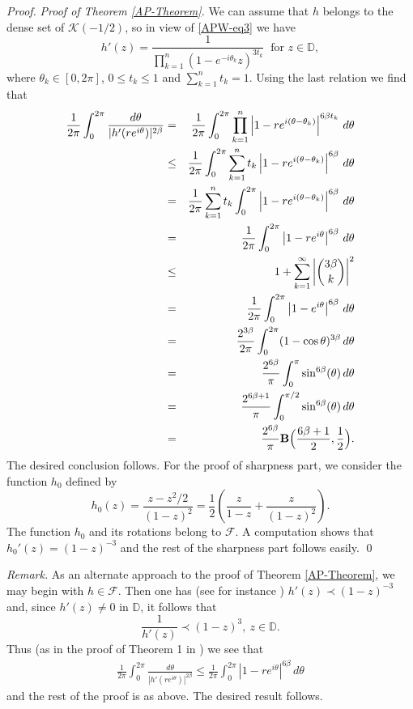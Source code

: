 \documentclass[a4paper,12pt]{amsart}
\theoremstyle{definition}
\newenvironment{rem}{\bigskip
\noindent \textsl{{\sl Remark. }}}{\bigskip}
\newenvironment{pf}[1][]{ \vskip 3mm
 \noindent
 \ifthenelse{\equal{#1}{}}  {{\slshape Proof. }}  {{\slshape #1.} } }{\qed\bigskip}
\begin{document}
\begin{pf}[Proof of Theorem \ref{AP-Theorem}]
We can assume that $h$ belongs to the dense set of $ \mathcal{K}(-1/2)$, so in view of 
\eqref{APW-eq3} we have
$$h'(z)=\frac{1}{\prod _{k=1}^n(1-e^{-i\theta _k}z)^{3t _{k}}} ~\mbox{ for $z\in {{\mathbb D}}$}, 
$$
where $\theta _k\in [0,2\pi]$, $0\leq t _{k}\leq 1$ and $\sum\limits_{k=1}^{n}t _{k}=1$. Using the last relation we find that
\begin{eqnarray*}
\frac{1}{2\pi}\int_{0}^{2\pi}\frac{d\theta}{|h'(re^{i\theta})|^{2\beta }}
&= &\frac{1}{2\pi}\int_{0}^{2\pi} \prod _{k=1}^n\left |1-re^{i(\theta -\theta _k)}\right |^{6\beta t _{k}} \,d\theta\\
&\leq &\frac{1}{2\pi}\int_{0}^{2\pi} \sum _{k=1}^nt _{k}\left |1-re^{i(\theta -\theta _k)}\right |^{6\beta } \,d\theta\\
&=&\frac{1}{2\pi}\sum _{k=1}^nt _{k}\int_{0}^{2\pi} \left |1-re^{i(\theta -\theta _k)}\right |^{6\beta } \,d\theta\\
&=& \frac{1}{2\pi}\int_{0}^{2\pi} \left |1-re^{i\theta }\right |^{6\beta } \,d\theta\\
&\leq & 1+ \sum_{k=1}^\infty \left|{3\beta \choose k}\right |^2\\
&= &\frac{1}{2\pi}\int_{0}^{2\pi} \left |1-e^{i\theta }\right |^{6\beta } \,d\theta\\
&=& \frac{2^{3\beta}}{2\pi}\int_{0}^{2\pi} (1-\cos \theta )^{3\beta } \,d\theta\\
&=& \frac{2^{6\beta }}{\pi}\int_{0}^{\pi} \sin^{6\beta} (\theta) \, d\theta\\
&=& \frac{2^{6\beta +1}}{\pi}\int_{0}^{\pi/2} \sin^{6\beta} (\theta) \, d\theta\\
&=& \frac{2^{6\beta }}{\pi}{\bf B}\Big (\frac{6\beta +1}{2},\frac{1}{2}\Big ).
\end{eqnarray*}
The desired conclusion follows. For the proof of sharpness part, we consider the function $h_0$ defined by
\begin{equation}\label{APW-eq4}
h_0(z)=\frac{z-z^2/2}{(1-z)^2} 
=\frac{1}{2}\left (\frac{z}{1-z} +\frac{z}{(1-z)^2}\right ).
\end{equation}
The function $h_0$ and its rotations belong to $\mathcal{F}$. A computation shows that $h_0'(z)=(1-z)^{-3}$
and the rest of the sharpness part follows easily.
\end{pf}

\begin{rem} As an alternate approach to the proof of Theorem \ref{AP-Theorem}, we may begin with $h\in \mathcal{F}$.
Then one has (see for instance \cite{samy-hiroshi-swadesh}) $h'(z)\prec (1-z)^{-3}$
and, since $h'(z)\neq 0$ in ${{\mathbb D}}$, it follows that
$$\frac{1}{h'(z)} \prec (1-z)^3, ~z\in {{\mathbb D}}.
$$
Thus (as in the proof of Theorem 1 in \cite{PoWi2014}) we see that
\begin{eqnarray*}
\frac{1}{2\pi}\int_{0}^{2\pi}\frac{d\theta}{|h'(re^{i\theta})|^{2\beta }}
\leq \frac{1}{2\pi}\int_{0}^{2\pi} \left |1-re^{i\theta }\right |^{6\beta } \,d\theta
\end{eqnarray*}
and the rest of the proof is as above. The desired result follows.
\end{rem}
\end{document}
